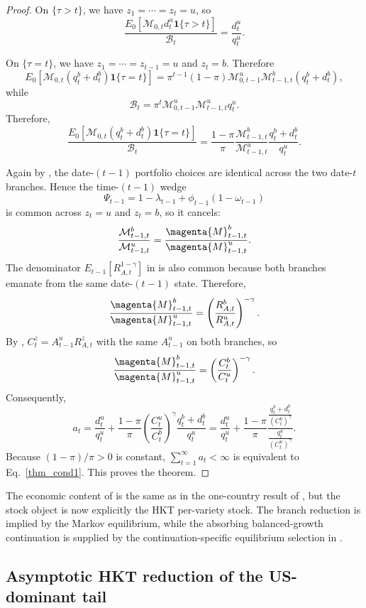 \documentclass{article}
\def\green#1{#1}%
\begin{document}
\begin{proof}
On $\{\tau>t\}$, we have $z_1=\cdots=z_t=u$, so
\[
\frac{
E_0\!\left[\mathcal M_{0,t}d_t^u\mathbf 1\{\tau>t\}\right]
}{
\mathcal B_t
}
=
\frac{d_t^u}{q_t^u}.
\]

On $\{\tau=t\}$, we have $z_1=\cdots=z_{t-1}=u$ and $z_t=b$. Therefore
\[
E_0\!\left[\mathcal M_{0,t}(q_t^b+d_t^b)\mathbf 1\{\tau=t\}\right]
=
\pi^{t-1}(1-\pi)\mathcal M_{0,t-1}^u\mathcal M_{t-1,t}^b(q_t^b+d_t^b),
\]
while
\[
\mathcal B_t
=
\pi^t\mathcal M_{0,t-1}^u\mathcal M_{t-1,t}^u q_t^u.
\]
Therefore,
\[
\frac{
E_0\!\left[\mathcal M_{0,t}(q_t^b+d_t^b)\mathbf 1\{\tau=t\}\right]
}{
\mathcal B_t
}
=
\frac{1-\pi}{\pi}
\frac{\mathcal M_{t-1,t}^b}{\mathcal M_{t-1,t}^u}
\frac{q_t^b+d_t^b}{q_t^u}.
\]

Again by , the date-$(t-1)$ portfolio choices are identical across the two date-$t$ branches. Hence the time-$(t-1)$ wedge
\[
\Psi_{t-1}=1-\lambda_{t-1}+\phi_{t-1}(1-\omega_{t-1})
\]
is common across $z_t=u$ and $z_t=b$, so it cancels:
\[
\frac{\mathcal M_{t-1,t}^b}{\mathcal M_{t-1,t}^u}
=
\frac{\magenta{M}_{t-1,t}^b}{\magenta{M}_{t-1,t}^u}.
\]
The denominator $E_{t-1}[R_{A,t}^{1-\gamma}]$ in  is also common because both branches emanate from the same date-$(t-1)$ state. Therefore,
\[
\frac{\magenta{M}_{t-1,t}^b}{\magenta{M}_{t-1,t}^u}
=
\left(\frac{R_{A,t}^b}{R_{A,t}^u}\right)^{-\gamma}.
\]
By , $C_t^z=A_{t-1}^uR_{A,t}^z$ with the same $A_{t-1}^u$ on both branches, so
\[
\frac{\magenta{M}_{t-1,t}^b}{\magenta{M}_{t-1,t}^u}
=
\left(\frac{C_t^b}{C_t^u}\right)^{-\gamma}.
\]
Consequently,
\[
a_t
=
\frac{d_t^u}{q_t^u}
+
\frac{1-\pi}{\pi}
\left(\frac{C_t^u}{C_t^b}\right)^\gamma
\frac{q_t^b+d_t^b}{q_t^u}
=
\frac{d_t^u}{q_t^u}
+
\frac{1-\pi}{\pi}
\frac{\frac{q_t^b+d_t^b}{(C_t^b)^\gamma}}{\frac{q_t^u}{(C_t^u)^\gamma}}.
\]
Because $(1-\pi)/\pi>0$ is constant, $\sum_{t=1}^\infty a_t<\infty$ is equivalent to Eq.~\eqref{thm_cond1}. This proves the theorem.
\end{proof}

The economic content of  is the same as in the one-country result of \citet{hirano2025technological}, but the stock object is now explicitly the HKT per-variety stock. The \green{branch reduction is implied by} the Markov equilibrium, \green{while} the absorbing balanced-growth continuation \green{is supplied by the continuation-specific equilibrium selection in }.

\subsection{Asymptotic HKT reduction of the US-dominant tail}\label{subsec_hkt_tail_reduction}
\end{document}

